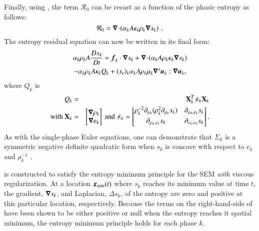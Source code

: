 \documentclass[preprint,10pt]{elsarticle}
\begin{document}
Finally, using , the term $\mathcal{R}_0$ can be recast as a function of the phasic entropy as follows: 
%
\begin{equation}
\mathcal{R}_0 = \boldsymbol\nabla\! \cdot \! \left( \alpha_k A \kappa_k \rho_k \boldsymbol\nabla s_k \right) \,.
\end{equation}
%
The entropy residual equation can now be written in its final form:
%
\begin{multline}\label{eq:ent-res-7-eqn-diss-terms3}
\alpha_k \rho_k A \frac{Ds_k}{Dt} =  \boldsymbol f_k \cdot \boldsymbol\nabla s_k + \boldsymbol\nabla\! \cdot \! \left( \alpha_k A \rho_k \kappa_k  \boldsymbol\nabla s_k \right)  \\
- \alpha_k \rho_k A \kappa_k Q_k + (s_e)_k \alpha_k A \rho_k \mu_k \boldsymbol\nabla^s \boldsymbol u_k : \boldsymbol\nabla \boldsymbol u_k,
\end{multline}
%
where $Q_k$ is 
%
\begin{eqnarray}
Q_k &=& \mathbf{X}^T_k \mathbb{\Sigma}_k \mathbf{X}_k \nonumber \\
\text{with } \mathbf{X}_k &=& \begin{bmatrix}
\boldsymbol\nabla \rho_k \\
\boldsymbol\nabla e_k 
\end{bmatrix}
\text{ and } \mathbb{\Sigma}_k = \begin{bmatrix}
       \rho_k^{-2} \partial_{\rho_k} (\rho^2_k \partial_{\rho_k} s_k) & \partial_{\rho_k,e_k} s_k  \\[0.3em]
       \partial_{\rho_k,e_k} s_k & \partial_{e_k,e_k} s_k           \\[0.3em]
     \end{bmatrix}. \nonumber 
\end{eqnarray}
%
As with the single-phase Euler equations, one can demonstrate that $\mathbb{\Sigma}_k$ is a symmetric negative definite quadratic form 
when $s_k$ is concave with respect to $e_k$ and $\rho_k^{-1}$  \cite{jlg, Marco_paper_low_mach}.

 is constructed to satisfy the entropy minimum principle for the SEM \emph{with} viscous regularization. At a location $\boldsymbol x_{min}(t)$ where $s_k$ reaches its minimum value at time $t$, the gradient, $\boldsymbol\nabla s_k$, and Laplacian, $\Delta s_k$,  of the entropy are zero and positive at this particular location, respectively. %
Because the terms on the right-hand-side of  have been shown to be either positive or null when the entropy reaches it spatial minimum, the entropy minimum principle holds for each phase $k$.
%
%
 
\end{document}

